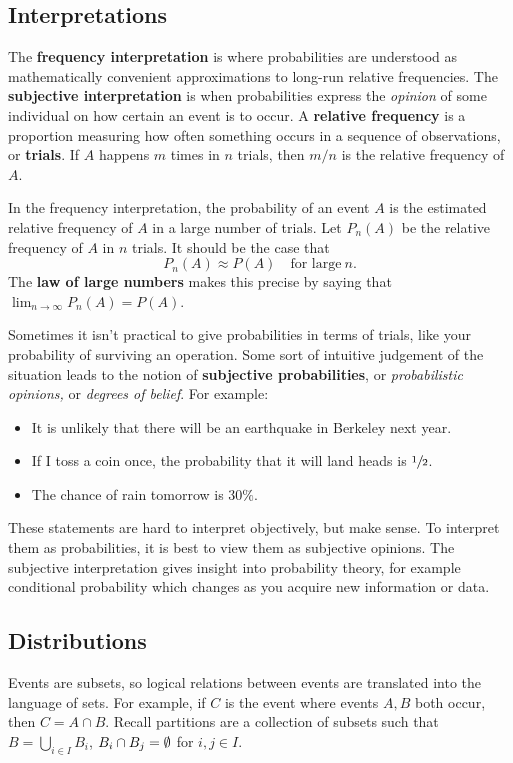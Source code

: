 \subsection{Interpretations}
The \textbf{frequency interpretation} is where probabilities are understood as mathematically convenient approximations to long-run relative frequencies. The \textbf{subjective interpretation} is when probabilities express the \emph{opinion} of some individual on how certain an event is to occur. A \textbf{relative frequency} is a proportion measuring how often something occurs in a sequence of observations, or \textbf{trials}. If $A$ happens $m$ times in $n$ trials, then $m /n$ is the relative frequency of $A$.

In the frequency interpretation, the probability of an event $A$ is the estimated relative frequency of $A$ in a large number of trials. Let $P_n (A)$ be the relative frequency of $A$ in $n$ trials. It should be the case that \[
    P_n (A) \approx P(A) \quad \text{for large} \ n.
\] The \textbf{law of large numbers} makes this precise by saying that $\lim _{n \to \infty}P_n (A)=P(A)$.

Sometimes it isn't practical to give probabilities in terms of trials, like your probability of surviving an operation. Some sort of intuitive judgement of the situation leads to the notion of \textbf{subjective probabilities}, or \emph{probabilistic opinions,} or \emph{degrees of belief}. For example:
\begin{itemize}
\setlength\itemsep{-.2em}
    \item It is unlikely that there will be an earthquake in Berkeley next year.
    \item If I toss a coin once, the probability that it will land heads is $\sfrac{1}{2}$.
    \item The chance of rain tomorrow is $30\%$.
\end{itemize}
These statements are hard to interpret objectively, but make sense. To interpret them as probabilities, it is best to view them as subjective opinions. The subjective interpretation gives insight into probability theory, for example conditional probability which changes as you acquire new information or data.

\subsection{Distributions}
Events are subsets, so logical relations between events are translated into the language of sets. For example, if $C$ is the event where events $A,B$ both occur, then $C=A \cap B.$ Recall partitions are a collection of subsets such that $B = \bigcup_{i \in I} B_i $, $B_i \cap B_j =\emptyset$ for $i,j \in I$.


